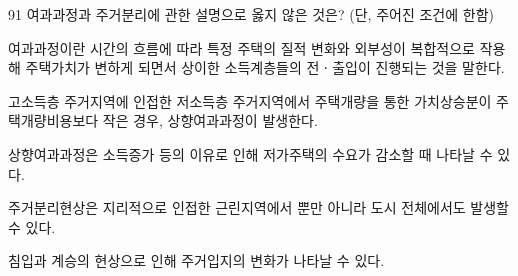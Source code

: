 \begin{question}{91}
여과과정과 주거분리에 관한 설명으로 옳지 않은 것은? (단, 주어진 조건에 한함)
\begin{choices}
  \item 여과과정이란 시간의 흐름에 따라 특정 주택의 질적 변화와 외부성이 복합적으로 작용해 주택가치가 변하게 되면서 상이한 소득계층들의 전ㆍ출입이 진행되는 것을 말한다.
  \item 고소득층 주거지역에 인접한 저소득층 주거지역에서 주택개량을 통한 가치상승분이 주택개량비용보다 작은 경우, 상향여과과정이 발생한다.
  \item 상향여과과정은 소득증가 등의 이유로 인해 저가주택의 수요가 감소할 때 나타날 수 있다.
  \item 주거분리현상은 지리적으로 인접한 근린지역에서 뿐만 아니라 도시 전체에서도 발생할 수 있다.
  \item 침입과 계승의 현상으로 인해 주거입지의 변화가 나타날 수 있다.
\end{choices}
\end{question}
